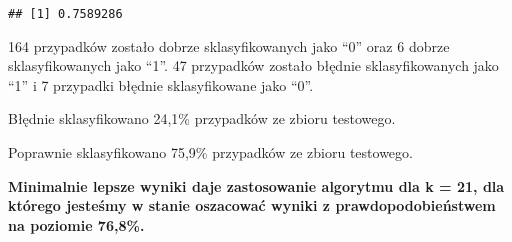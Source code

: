 \documentclass[]{article}
\begin{document}
\begin{verbatim}
## [1] 0.7589286
\end{verbatim}

164 przypadków zostało dobrze sklasyfikowanych jako ``0'' oraz 6 dobrze
sklasyfikowanych jako ``1''. 47 przypadków zostało błędnie
sklasyfikowanych jako ``1'' i 7 przypadki błędnie sklasyfikowane jako
``0''.

Błędnie sklasyfikowano 24,1\% przypadków ze zbioru testowego.

Poprawnie sklasyfikowano 75,9\% przypadków ze zbioru testowego.

\textbf{Minimalnie lepsze wyniki daje zastosowanie algorytmu dla k = 21,
dla którego jesteśmy w stanie oszacować wyniki z prawdopodobieństwem na
poziomie 76,8\%.}
\end{document}
